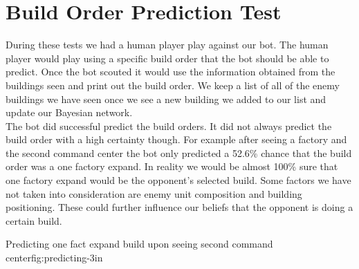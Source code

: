 \section{Build Order Prediction Test}
During these tests we had a human player play against our bot. The human player would play using a specific build order that the bot should be able to predict. Once the bot scouted it would use the information obtained from the buildings seen and print out the build order. We keep a list of all of the enemy buildings we have seen once we see a new building we added to our list and update our Bayesian network.\\
The bot did successful predict the build orders. It did not always predict the build order with a high certainty though. For example after seeing a factory and the second command center the bot only predicted a 52.6\% chance that the build order was a one factory expand. In reality we would be almost 100\% sure that one factory expand would be the opponent's selected build. Some factors we have not taken into consideration are enemy unit composition and building positioning. These could further influence our beliefs that the opponent is doing a certain build.

			{Predicting one fact expand build upon seeing second command center}{fig:predicting}{-3in}
